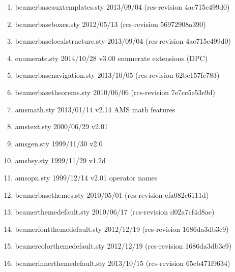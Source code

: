 \begin{enumerate}
\item 		 beamerbaseauxtemplates.sty 2013/09/04 (rcs-revision 4ac715c499d0)
\item 		 beamerbaseboxes.sty 2012/05/13 (rcs-revision 56972908a390)
\item 		 beamerbaselocalstructure.sty 2013/09/04 (rcs-revision 4ac715c499d0)
\item 		 enumerate.sty 2014/10/28 v3.00 enumerate extensions (DPC)
\item 		 beamerbasenavigation.sty 2013/10/05 (rcs-revision 62be157fe783)
\item 		 beamerbasetheorems.sty 2010/06/06 (rcs-revision 7e7cc5e53e9d)
\item 		 amsmath.sty 2013/01/14 v2.14 AMS math features
\item amstext.sty 2000/06/29 v2.01
\item amsgen.sty 1999/11/30 v2.0
\item amsbsy.sty 1999/11/29 v1.2d
\item amsopn.sty 1999/12/14 v2.01 operator names
\item 		 beamerbasethemes.sty 2010/05/01 (rcs-revision efa082c6111d)
\item 		 beamerthemedefault.sty 2010/06/17 (rcs-revision d02a7cf4d8ae)
\item 		 beamerfontthemedefault.sty 2012/12/19 (rcs-revision 1686da3db3c9)
\item 		 beamercolorthemedefault.sty	 2012/12/19 (rcs-revision 1686da3db3c9)
\item 		 beamerinnerthemedefault.sty 2013/10/15 (rcs-revision 65cb471f9634)

\end{enumerate}
